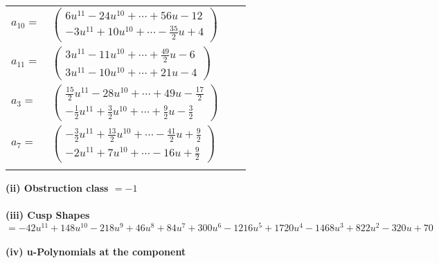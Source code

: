 \documentclass[1p]{elsarticle_modified}
\theoremstyle{definition}
\begin{document}
\begin{tabular}{m{7pt} m{180pt} m{7pt} m{180pt} }
\flushright $a_{10}=$&$\begin{pmatrix}6 u^{11}-24 u^{10}+\cdots+56 u-12\\-3 u^{11}+10 u^{10}+\cdots-\frac{35}{2} u+4\end{pmatrix}$ \\
\flushright $a_{11}=$&$\begin{pmatrix}3 u^{11}-11 u^{10}+\cdots+\frac{49}{2} u-6\\3 u^{11}-10 u^{10}+\cdots+21 u-4\end{pmatrix}$ \\
\flushright $a_{3}=$&$\begin{pmatrix}\frac{15}{2} u^{11}-28 u^{10}+\cdots+49 u-\frac{17}{2}\\-\frac{1}{2} u^{11}+\frac{3}{2} u^{10}+\cdots+\frac{9}{2} u-\frac{3}{2}\end{pmatrix}$ \\
\flushright $a_{7}=$&$\begin{pmatrix}-\frac{3}{2} u^{11}+\frac{13}{2} u^{10}+\cdots-\frac{41}{2} u+\frac{9}{2}\\-2 u^{11}+7 u^{10}+\cdots-16 u+\frac{9}{2}\end{pmatrix}$\\&\end{tabular}
\flushleft \textbf{(ii) Obstruction class $= -1$}\\~\\
\flushleft \textbf{(iii) Cusp Shapes $= -42 u^{11}+148 u^{10}-218 u^9+46 u^8+84 u^7+300 u^6-1216 u^5+1720 u^4-1468 u^3+822 u^2-320 u+70$}\\~\\
\newpage\renewcommand{\arraystretch}{1}
\flushleft \textbf{(iv) u-Polynomials at the component}\newline \\
\end{document}
